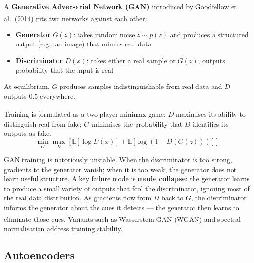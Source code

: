 \begin{tcbitemize}[ skin=sectionraster ]
    \tcbitem[title={Generator and Discriminator}, raster multicolumn=3]
    A \textbf{Generative Adversarial Network (GAN)} introduced by Goodfellow et al.\ (2014) pits two networks against each other\textsuperscript{\cite[][p.~125]{fleuretLittleBookDeep}}:
    \begin{itemize}
        \item \textbf{Generator} $G(z)$: takes random noise $z \sim p(z)$ and produces a structured output (e.g., an image) that mimics real data
        \item \textbf{Discriminator} $D(x)$: takes either a real sample or $G(z)$; outputs probability that the input is real
    \end{itemize}
    At equilibrium, $G$ produces samples indistinguishable from real data and $D$ outputs $0.5$ everywhere.

    \tcbitem[title={The Minimax Objective}, raster multicolumn=3]
    Training is formulated as a two-player minimax game\textsuperscript{\cite[][p.~125]{fleuretLittleBookDeep}}: $D$ maximises its ability to distinguish real from fake; $G$ minimises the probability that $D$ identifies its outputs as fake.
    \tcblower
    \begin{equation}
        \min_G \max_D \;\bigl[\,\mathbb{E}[\log D(x)] + \mathbb{E}[\log(1 - D(G(z)))]\,\bigr]
    \end{equation}

    \tcbitem[title={Training Dynamics and Mode Collapse}, raster multicolumn=6]
    GAN training is notoriously unstable.
    When the discriminator is too strong, gradients to the generator vanish; when it is too weak, the generator does not learn useful structure.
    A key failure mode is \textbf{mode collapse}: the generator learns to produce a small variety of outputs that fool the discriminator, ignoring most of the real data distribution.
    As gradients flow from $D$ back to $G$, the discriminator informs the generator about the cues it detects --- the generator then learns to eliminate those cues\textsuperscript{\cite[][p.~125]{fleuretLittleBookDeep}}.
    Variants such as Wasserstein GAN (WGAN) and spectral normalisation address training stability.
\end{tcbitemize}

\subsection{Autoencoders}

